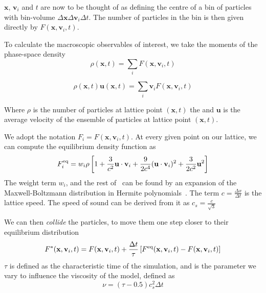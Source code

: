 $\mathbf x$, $\mathbf v_{i}$ and $t$ are now to be thought of as defining the centre of a bin of particles with bin-volume $\Delta \mathbf x \Delta \mathbf v_{i}\Delta t$.
The number of particles in the bin is then given directly by $F(\mathbf x, \mathbf v_{i}, t)$.


To calculate the macroscopic observables of interest, we take the moments of the phase-space density
\begin{equation}
  \rho(\mathbf x, t) = \sum_{i} F(\mathbf x, \mathbf v_{i}, t)
\end{equation}

\begin{equation}
  \rho(\mathbf x, t)  \mathbf u(\mathbf x, t) = \sum_{i} \mathbf v_{i} F(\mathbf x, \mathbf v_{i}, t)
\end{equation}

Where $\rho$ is the number of particles at lattice point $(\mathbf x, t)$ the and $\mathbf u$ is the average velocity of the ensemble of particles at lattice point $(\mathbf x, t)$.


We adopt the notation $F_{i} = F(\mathbf x, \mathbf v_{i}, t)$. At every given point on our lattice, we can compute the equilibrium density function as~\cite{bottcher_computational_2021}
\begin{equation}\label{eq:equilibrium}
  F^{\textnormal{eq}}_{i}
  = w_{i}\rho
  \left[1
    + \frac{3}{c^{2}}\mathbf u \cdot \mathbf v_{i}
    + \frac{9}{2c^{4}}(\mathbf u \cdot \mathbf v_{i})^{2}
    + \frac{3}{2c^{2}}\mathbf u^{2}
  \right]
\end{equation}
The weight term $w_{i}$, and the rest of~ can be found by an expansion of the Maxwell-Boltzmann distribution in Hermite polynomials~\cite{bottcher_computational_2021}. The term $c=\frac{\Delta x}{\Delta t}$ is the lattice speed.
The speed of sound can be derived from it as $c_{s} = \frac{c}{\sqrt 3}$

We can then \emph{collide} the particles, to move them one step closer to their equilibrium distribution
\begin{equation}
  F^{*}(\mathbf x, \mathbf v_{i}, t)
  = F(\mathbf x, \mathbf v_{i}, t)
  + \frac{\Delta t}{\tau}
  \left[
    F^{\textnormal{eq}}(\mathbf x, \mathbf v_{i}, t)
    - F(\mathbf x, \mathbf v_{i}, t)
  \right]
\end{equation}
$\tau$ is defined as the characteristic time of the simulation, and is the parameter we vary to influence the viscosity of the model, defined as~\cite{mei_lattice_2000}
\begin{equation}
  \nu = (\tau - 0.5)c_{s}^{2} \Delta t
\end{equation}


